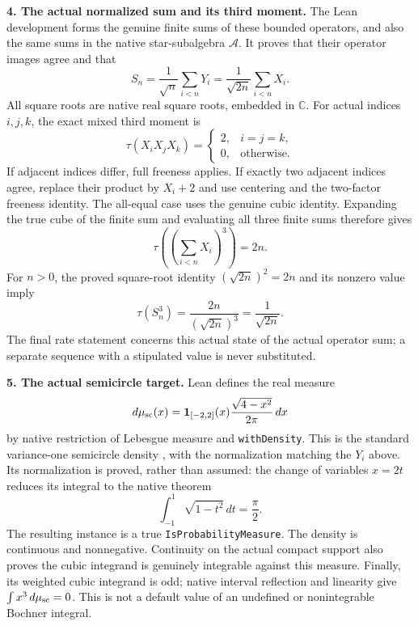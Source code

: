 \documentclass[10pt]{article}
\newcommand{\C}{\mathbb C}
\newcommand{\A}{\mathcal A}
\begin{document}
\textbf{4. The actual normalized sum and its third moment.}
The Lean development forms the genuine finite sums of these bounded
operators, and also the same sums in the native star-subalgebra $\A$.
It proves that their operator images agree and that
\[
 S_n=\frac1{\sqrt n}\sum_{i<n}Y_i
     =\frac1{\sqrt{2n}}\sum_{i<n}X_i.
\]
All square roots are native real square roots, embedded in $\C$.
For actual indices $i,j,k$, the exact mixed third moment is
\[
 \tau(X_iX_jX_k)=
 \begin{cases}2,&i=j=k,\\0,&\text{otherwise.}\end{cases}
\]
If adjacent indices differ, full freeness applies. If exactly two
adjacent indices agree, replace their product by $X_i+2$ and use
centering and the two-factor freeness identity. The all-equal case
uses the genuine cubic identity. Expanding the true cube of the finite
sum and evaluating all three finite sums therefore gives
\[
 \tau\left(\left(\sum_{i<n}X_i\right)^3\right)=2n.
\]
For $n>0$, the proved square-root identity $(\sqrt{2n})^2=2n$
and its nonzero value imply
\[
 \tau(S_n^3)=\frac{2n}{(\sqrt{2n})^3}
            =\frac1{\sqrt{2n}}.
\]
The final rate statement concerns this actual state of the actual
operator sum; a separate sequence with a stipulated value is never
substituted.

\textbf{5. The actual semicircle target.}
Lean defines the real measure
\[
 d\mu_{\rm sc}(x)=\mathbf1_{[-2,2]}(x)
       \frac{\sqrt{4-x^2}}{2\pi}\,dx
\]
by native restriction of Lebesgue measure and \texttt{withDensity}.
This is the standard variance-one semicircle density
\cite[p.~327]{Novak}, with the normalization matching the $Y_i$ above.
Its normalization is proved, rather than assumed: the change of
variables $x=2t$ reduces its integral to the native theorem
\[
 \int_{-1}^{1}\sqrt{1-t^2}\,dt=\frac\pi2.
\]
The resulting instance is a true \texttt{IsProbabilityMeasure}.
The density is continuous and nonnegative. Continuity on the actual
compact support also proves the cubic integrand is genuinely integrable
against this measure. Finally, its weighted cubic integrand is odd;
native interval reflection and linearity give
$\int x^3\,d\mu_{\rm sc}=0$. This is not a default value of an
undefined or nonintegrable Bochner integral.
\end{document}
